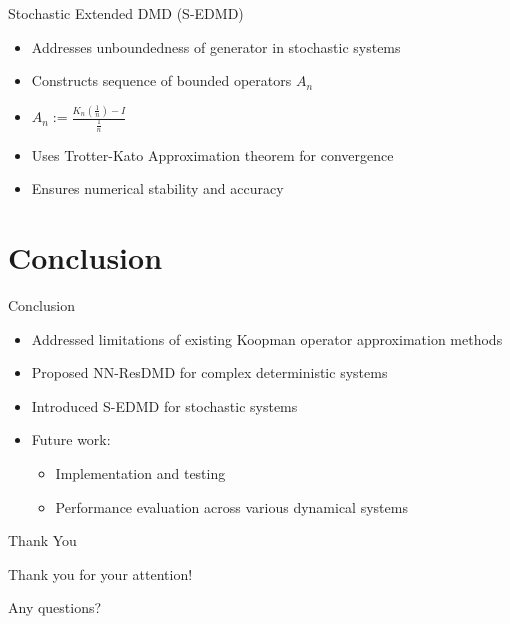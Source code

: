 \documentclass{beamer}
\begin{document}
	\begin{frame}{Stochastic Extended DMD (S-EDMD)}
		\begin{itemize}
			\item Addresses unboundedness of generator in stochastic systems
			\item Constructs sequence of bounded operators $A_n$
			\item $A_n := \frac{K_n(\frac{1}{n}) - I}{\frac{1}{n}}$
			\item Uses Trotter-Kato Approximation theorem for convergence
			\item Ensures numerical stability and accuracy
		\end{itemize}
	\end{frame}
	
	\section{Conclusion}
	
	\begin{frame}{Conclusion}
		\begin{itemize}
			\item Addressed limitations of existing Koopman operator approximation methods
			\item Proposed NN-ResDMD for complex deterministic systems
			\item Introduced S-EDMD for stochastic systems
			\item Future work:
			\begin{itemize}
				\item Implementation and testing
				\item Performance evaluation across various dynamical systems
			\end{itemize}
		\end{itemize}
	\end{frame}
	
	\begin{frame}{Thank You}
		\begin{center}
			\Large{Thank you for your attention!}
			
			\vspace{1cm}
			
			Any questions?
		\end{center}
	\end{frame}
	
\end{document}
